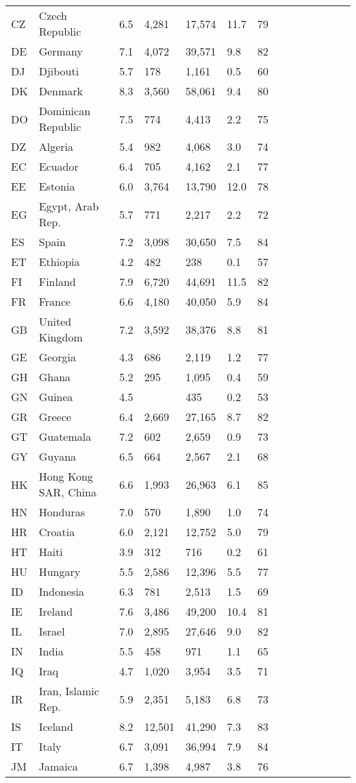 \begin{scriptsize}
\begin{center}
\begin{longtable}{llllllllllllll}
CZ&Czech Republic&6.5&4,281&17,574&11.7&79\\
DE&Germany&7.1&4,072&39,571&9.8&82\\
DJ&Djibouti&5.7&178&1,161&0.5&60\\
DK&Denmark&8.3&3,560&58,061&9.4&80\\
DO&Dominican Republic&7.5&774&4,413&2.2&75\\
DZ&Algeria&5.4&982&4,068&3.0&74\\
EC&Ecuador&6.4&705&4,162&2.1&77\\
EE&Estonia&6.0&3,764&13,790&12.0&78\\
EG&Egypt, Arab Rep.&5.7&771&2,217&2.2&72\\
ES&Spain&7.2&3,098&30,650&7.5&84\\
ET&Ethiopia&4.2&482&238&0.1&57\\
FI&Finland&7.9&6,720&44,691&11.5&82\\
FR&France&6.6&4,180&40,050&5.9&84\\
GB&United Kingdom&7.2&3,592&38,376&8.8&81\\
GE&Georgia&4.3&686&2,119&1.2&77\\
GH&Ghana&5.2&295&1,095&0.4&59\\
GN&Guinea&4.5&&435&0.2&53\\
GR&Greece&6.4&2,669&27,165&8.7&82\\
GT&Guatemala&7.2&602&2,659&0.9&73\\
GY&Guyana&6.5&664&2,567&2.1&68\\
HK&Hong Kong SAR, China&6.6&1,993&26,963&6.1&85\\
HN&Honduras&7.0&570&1,890&1.0&74\\
HR&Croatia&6.0&2,121&12,752&5.0&79\\
HT&Haiti&3.9&312&716&0.2&61\\
HU&Hungary&5.5&2,586&12,396&5.5&77\\
ID&Indonesia&6.3&781&2,513&1.5&69\\
IE&Ireland&7.6&3,486&49,200&10.4&81\\
IL&Israel&7.0&2,895&27,646&9.0&82\\
IN&India&5.5&458&971&1.1&65\\
IQ&Iraq&4.7&1,020&3,954&3.5&71\\
IR&Iran, Islamic Rep.&5.9&2,351&5,183&6.8&73\\
IS&Iceland&8.2&12,501&41,290&7.3&83\\
IT&Italy&6.7&3,091&36,994&7.9&84\\
JM&Jamaica&6.7&1,398&4,987&3.8&76\\

\end{longtable}
\end{center}
\end{scriptsize}
